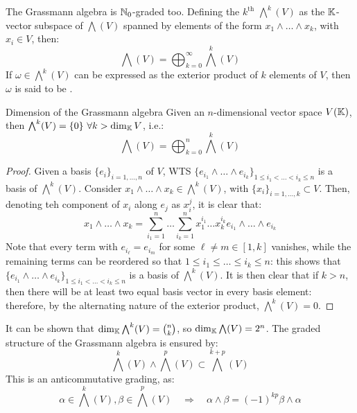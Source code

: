 The Grassmann algebra is $ \mathbb{N}_0 $-graded too. Defining the $ k^\text{th} $  $ {\bigwedge}^k(V) $ as the $ \mathbb{K} $-vector subspace of $ \bigwedge(V) $ spanned by elements of the form $ x_1 \wedge \dots \wedge x_k $, with $ x_i \in V $, then:
\begin{equation}
  \bigwedge(V) = \bigoplus_{k = 0}^\infty {\bigwedge}^k(V)
\end{equation}
If $ \omega \in {\bigwedge}^k(V) $ can be expressed as the exterior product of $ k $ elements of $ V $, then $ \omega $ is said to be .

\begin{theorem}{Dimension of the Grassmann algebra}{}
  Given an $ n $-dimensional vector space $ V(\mathbb{K}) $, then $ {\bigwedge}^k(V) = \{0\} \,\,\forall k > \dim_{\mathbb{K}} V $, i.e.:
  \begin{equation}
  \bigwedge(V) = \bigoplus_{k = 0}^n {\bigwedge}^k(V)
  \end{equation}
\end{theorem}

\begin{proofbox}
  \begin{proof}
    Given a basis $ \{e_i\}_{i = 1, \dots, n} $ of $ V $, WTS $ \{e_{i_1} \wedge \dots \wedge e_{i_k}\}_{1 \le i_1 < \dots < i_k \le n} $ is a basis of $ {\bigwedge}^k(V) $. Consider $ x_1 \wedge \dots \wedge x_k \in {\bigwedge}^k(V) $, with $ \{x_i\}_{i = 1,\dots,k} \subset V $. Then, denoting teh component of $ x_i $ along $ e_j $ as $ x_i^j $, it is clear that:
    \begin{equation*}
      x_1 \wedge \dots \wedge x_k = \sum_{i_1 = 1}^n \dots \sum_{i_k = 1}^n x_1^{i_1} \dots x_k^{i_k} e_{i_1} \wedge \dots \wedge e_{i_k}
    \end{equation*}
    Note that every term with $ e_{i_\ell} = e_{i_m} $ for some $ \ell \neq m \in [1,k] $ vanishes, while  the remaining terms can be reordered so that $ 1 \le i_1 \le \dots \le i_k \le n $: this shows that $ \{e_{i_1} \wedge \dots \wedge e_{i_k}\}_{1 \le i_1 < \dots < i_k \le n} $ is a basis of $ {\bigwedge}^k(V) $. It is then clear that if $ k > n $, then there will be at least two equal basis vector in every basis element: therefore, by the alternating nature of the exterior product, $ {\bigwedge}^k(V) = {0} $.
  \end{proof}
\end{proofbox}

It can be shown that $ \dim_{\mathbb{K}} {\bigwedge}^k(V) = \binom{n}{k} $, so $ \dim_{\mathbb{K}} \bigwedge(V) = 2^n $. The graded structure of the Grassmann algebra is ensured by:
\begin{equation}
  {\bigwedge}^k(V) \wedge {\bigwedge}^p(V) \subset {\bigwedge}^{k+p}(V)
\end{equation}
This is an anticommutative grading, as:
\begin{equation}
  \alpha \in {\bigwedge}^k(V) , \beta \in {\bigwedge}^p(V)
  \quad \Rightarrow \quad
  \alpha \wedge \beta = (-1)^{kp} \beta \wedge \alpha
\end{equation}

